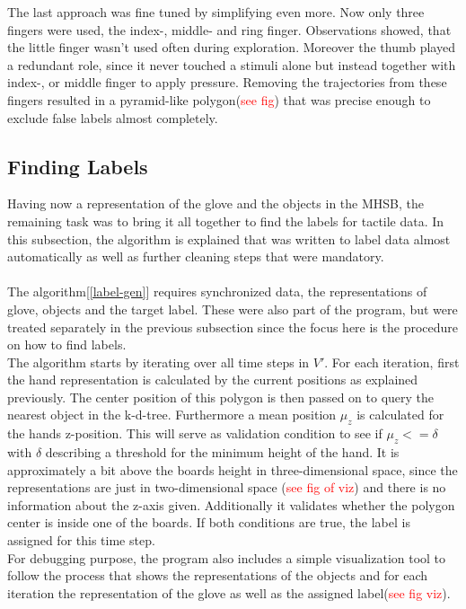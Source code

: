 The last approach was fine tuned by simplifying even more. Now only three fingers were used, the index-, middle- and ring finger. Observations showed, that the little finger wasn't used often during exploration. Moreover the thumb played a redundant role, since it never touched a stimuli alone but instead together with index-, or middle finger to apply pressure. Removing the trajectories from these fingers resulted in a pyramid-like polygon(\textcolor{red}{see fig}) that was precise enough to exclude false labels almost completely.       
 
  

\subsection{Finding Labels}
Having now a representation of the glove and the objects in the MHSB, the remaining task was to bring it all together to find the labels for tactile data. In this subsection, the algorithm is explained that was written to label data almost automatically as well as further cleaning steps that were mandatory.\\
\\
The algorithm[\ref{label-gen}] requires synchronized data, the representations of glove, objects and the target label. These were also part of the program, but were treated separately in the previous subsection since the focus here is the procedure on how to find labels. \\
The algorithm starts by iterating over all time steps in $ V' $. For each iteration, first the hand representation is calculated by the current positions as explained previously. The center position of this polygon is then passed on to query the nearest object in the k-d-tree. Furthermore a mean position $ \mu_{z} $ is calculated for the hands z-position. This will serve as validation condition to see if $ \mu_{z} <= \delta $ with $ \delta $ describing a threshold for the minimum height of the hand. It is approximately a bit above the boards height in three-dimensional space, since the representations are just in two-dimensional space (\textcolor{red}{see fig of viz}) and there is no information about the z-axis given. Additionally it validates whether the polygon center is inside one of the boards. If both conditions are true, the label is assigned for this time step.\\
For debugging purpose, the program also includes a simple visualization tool to follow the process that shows the representations of the objects and for each iteration the representation of the glove as well as the assigned label(\textcolor{red}{see fig viz}). \\

